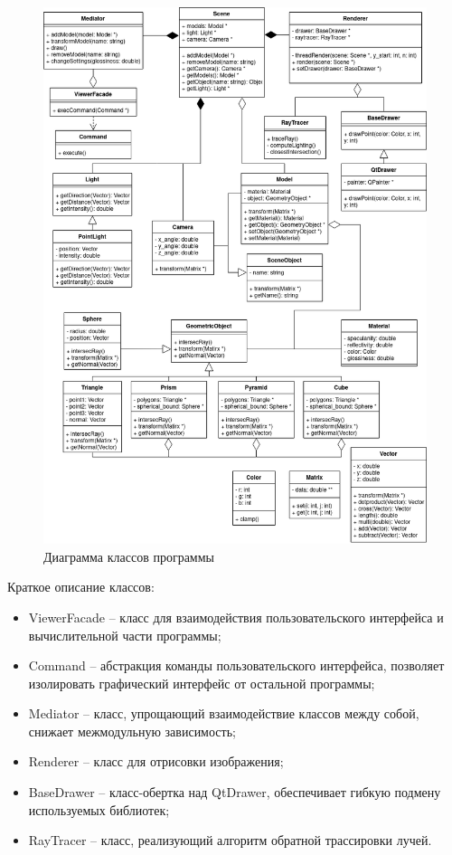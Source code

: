 \begin{figure}[H]
	\begin{center}
		\includegraphics[scale=0.53]{assets/classes.png}
	\end{center}
	\caption{Диаграмма классов программы}
	\label{classes_diagram}
\end{figure}

Краткое описание классов:
\begin{itemize}
	\item ViewerFacade -- класс для взаимодействия пользовательского интерфейса и вычислительной части программы;
	\item Command -- абстракция команды пользовательского интерфейса, позволяет изолировать графический интерфейс от остальной программы;
	\item Mediator -- класс, упрощающий взаимодействие классов между собой, снижает межмодульную зависимость;
	\item Renderer -- класс для отрисовки изображения;
	\item BaseDrawer -- класс-обертка над QtDrawer, обеспечивает гибкую подмену используемых библиотек;
	\item RayTracer -- класс, реализующий алгоритм обратной трассировки лучей.
\end{itemize}

